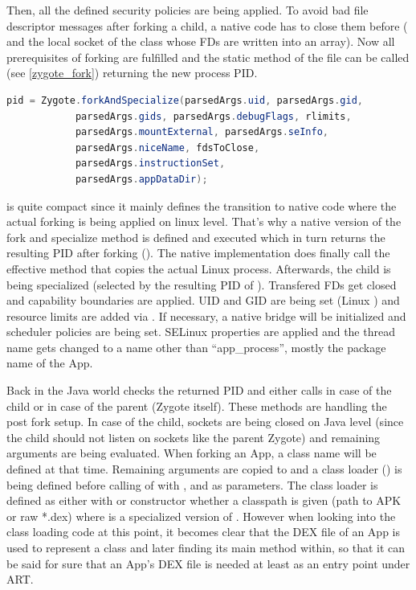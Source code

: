 Then, all the defined security policies are being applied. To avoid bad file
descriptor messages after forking a child, a native code has to close them before ( and the local socket  of the
 class whose FDs are written into an 
array).
Now all prerequisites of forking are fulfilled and the static method
 of the  file can be called
(see \autoref{zygote_fork}) returning the new process PID.
\begin{lstlisting}[language=Java, caption=Zygote Fork Call, label=zygote_fork]
pid = Zygote.forkAndSpecialize(parsedArgs.uid, parsedArgs.gid,
            parsedArgs.gids, parsedArgs.debugFlags, rlimits,
            parsedArgs.mountExternal, parsedArgs.seInfo,
            parsedArgs.niceName, fdsToClose,
            parsedArgs.instructionSet,
            parsedArgs.appDataDir);
\end{lstlisting}
 is quite compact since it mainly defines the transition
to native code where the actual forking is being applied on linux level. That's why
a native version of the fork and specialize method is defined and executed
which in turn returns the resulting PID after forking
().
The native implementation does finally call the effective  method
that copies the actual Linux process. Afterwards, the child is being
specialized (selected by the resulting PID of ).
Transfered FDs get closed and capability boundaries are applied.
UID and GID are being set (Linux ) and resource limits are added via .
If necessary, a native bridge will be initialized and scheduler policies
are being set. SELinux properties are applied and the thread name gets
changed to a name other than ``app\_process'', mostly the package name of the App.

Back in the Java world  checks the returned PID and either calls  in case of the child or
 in case of the parent (Zygote itself).
These methods are handling the post fork setup. In case of the child, sockets are being closed on Java level (since the child should not listen on sockets like the parent Zygote) and remaining arguments are being evaluated. When forking an App, a class name will be defined at that time. Remaining arguments are copied to  and a class loader () is being defined before calling  of  with ,  and  as parameters. The class loader  is defined as
either with  or  constructor whether a classpath is
given (path to APK or raw *.dex) where  is a specialized version of .
However when looking into the class loading code at this point, it becomes clear that the DEX file of an App is used to represent a class and later finding its main method within, so that
it can be said for sure that an App's DEX file is needed at least as an entry point under ART.

